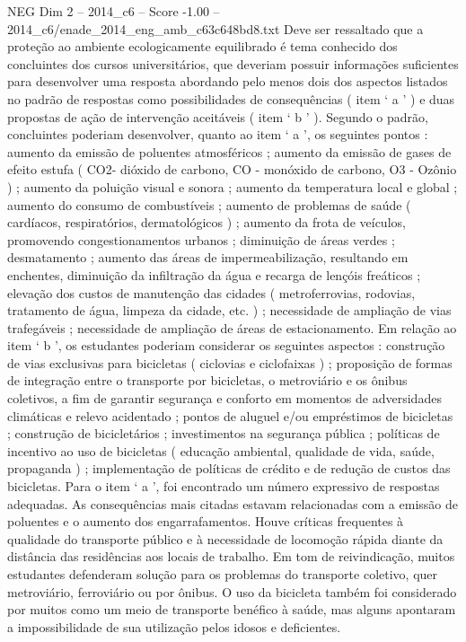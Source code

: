 \begin{textsample}{NEG Dim 2 – 2014\_c6 – Score -1.00 – 2014\_c6/enade\_2014\_eng\_amb\_c63c648bd8.txt}
Deve ser ressaltado que a proteção ao ambiente ecologicamente equilibrado é tema conhecido dos concluintes dos cursos universitários, que deveriam possuir informações suficientes para desenvolver uma resposta abordando pelo menos dois dos aspectos listados no padrão de respostas como possibilidades de consequências ( item ‘ a ’ ) e duas propostas de ação de intervenção aceitáveis ( item ‘ b ’ ).
Segundo o padrão, concluintes poderiam desenvolver, quanto ao item ‘ a ’, os seguintes pontos : aumento da emissão de poluentes atmosféricos ; aumento da emissão de gases de efeito estufa ( CO2- dióxido de carbono, CO - monóxido de carbono, O3 - Ozônio ) ; aumento da poluição visual e sonora ; aumento da temperatura local e global ; aumento do consumo de combustíveis ; aumento de problemas de saúde ( cardíacos, respiratórios, dermatológicos ) ; aumento da frota de veículos, promovendo congestionamentos urbanos ; diminuição de áreas verdes ; desmatamento ; aumento das áreas de impermeabilização, resultando em enchentes, diminuição da infiltração da água e recarga de lençóis freáticos ; elevação dos custos de manutenção das cidades ( metroferrovias, rodovias, tratamento de água, limpeza da cidade, etc. ) ; necessidade de ampliação de vias trafegáveis ; necessidade de ampliação de áreas de estacionamento.
Em relação ao item ‘ b ’, os estudantes poderiam considerar os seguintes aspectos : construção de vias exclusivas para bicicletas ( ciclovias e ciclofaixas ) ; proposição de formas de integração entre o transporte por bicicletas, o metroviário e os ônibus coletivos, a fim de garantir segurança e conforto em momentos de adversidades climáticas e relevo acidentado ; pontos de aluguel e/ou empréstimos de bicicletas ; construção de bicicletários ; investimentos na segurança pública ; políticas de incentivo ao uso de bicicletas ( educação ambiental, qualidade de vida, saúde, propaganda ) ; implementação de políticas de crédito e de redução de custos das bicicletas.
Para o item ‘ a ’, foi encontrado um número expressivo de respostas adequadas.
As consequências mais citadas estavam relacionadas com a emissão de poluentes e o aumento dos engarrafamentos.
Houve críticas frequentes à qualidade do transporte público e à necessidade de locomoção rápida diante da distância das residências aos locais de trabalho.
Em tom de reivindicação, muitos estudantes defenderam solução para os problemas do transporte coletivo, quer metroviário, ferroviário ou por ônibus.
O uso da bicicleta também foi considerado por muitos como um meio de transporte benéfico à saúde, mas alguns apontaram a impossibilidade de sua utilização pelos idosos e deficientes.

\end{textsample}
